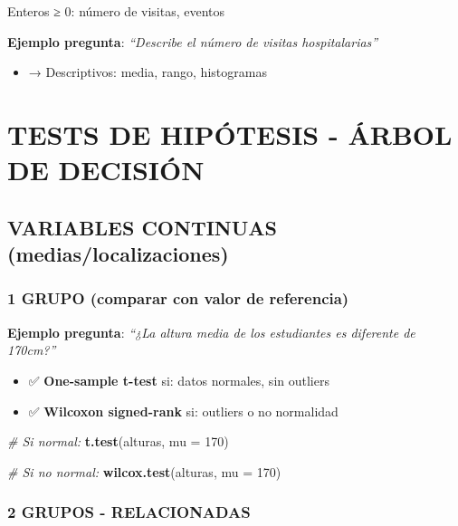 \documentclass[
  10pt,
]{article}
\newenvironment{Shaded}{\begin{snugshade}}{\end{snugshade}}
\newcommand{\AttributeTok}[1]{\textcolor[rgb]{0.13,0.29,0.53}{#1}}
\newcommand{\CommentTok}[1]{\textcolor[rgb]{0.56,0.35,0.01}{\textit{#1}}}
\newcommand{\DecValTok}[1]{\textcolor[rgb]{0.00,0.00,0.81}{#1}}
\newcommand{\FunctionTok}[1]{\textcolor[rgb]{0.13,0.29,0.53}{\textbf{#1}}}
\newcommand{\NormalTok}[1]{#1}
\providecommand{\tightlist}{%
  \setlength{\itemsep}{0pt}\setlength{\parskip}{0pt}}
\begin{document}
Enteros ≥ 0: número de visitas, eventos

\textbf{Ejemplo pregunta}: \emph{``Describe el número de visitas
hospitalarias''}

\begin{itemize}
\tightlist
\item
  → Descriptivos: media, rango, histogramas
\end{itemize}

\newpage

\section{TESTS DE HIPÓTESIS - ÁRBOL DE
DECISIÓN}\label{tests-de-hipuxf3tesis---uxe1rbol-de-decisiuxf3n}

\subsection{VARIABLES CONTINUAS
(medias/localizaciones)}\label{variables-continuas-mediaslocalizaciones}

\subsubsection{1 GRUPO (comparar con valor de
referencia)}\label{grupo-comparar-con-valor-de-referencia}

\textbf{Ejemplo pregunta}: \emph{``¿La altura media de los estudiantes
es diferente de 170cm?''}

\begin{itemize}
\tightlist
\item
  ✅ \textbf{One-sample t-test} si: datos normales, sin outliers
\item
  ✅ \textbf{Wilcoxon signed-rank} si: outliers o no normalidad
\end{itemize}

\begin{Shaded}
\begin{Highlighting}[]
\CommentTok{\# Si normal:}
\FunctionTok{t.test}\NormalTok{(alturas, }\AttributeTok{mu =} \DecValTok{170}\NormalTok{)}

\CommentTok{\# Si no normal:}
\FunctionTok{wilcox.test}\NormalTok{(alturas, }\AttributeTok{mu =} \DecValTok{170}\NormalTok{)}
\end{Highlighting}
\end{Shaded}

\subsubsection{2 GRUPOS - RELACIONADAS}\label{grupos---relacionadas}
\end{document}
